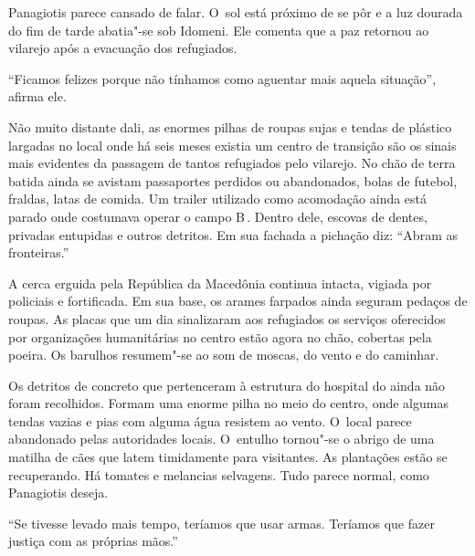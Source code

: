 Panagiotis parece cansado de falar. O~sol está próximo de se pôr e a luz
dourada do fim de tarde abatia"-se sob Idomeni. Ele comenta que a paz
retornou ao vilarejo após a evacuação dos refugiados.

``Ficamos felizes porque não tínhamos como aguentar mais aquela
situação'', afirma ele.

Não muito distante dali, as enormes pilhas de roupas sujas e tendas de
plástico largadas no local onde há seis meses existia um centro de
transição são os sinais mais evidentes da passagem de tantos refugiados
pelo vilarejo. No chão de terra batida ainda se avistam passaportes
perdidos ou abandonados, bolas de futebol, fraldas, latas de comida. Um
trailer utilizado como acomodação ainda está parado onde costumava
operar o campo B\,. Dentro dele, escovas de dentes, privadas entupidas e
outros detritos. Em sua fachada a pichação diz: ``Abram as fronteiras.''

A cerca erguida pela República da Macedônia continua intacta, vigiada
por policiais e fortificada. Em sua base, os arames farpados ainda
seguram pedaços de roupas. As placas que um dia sinalizaram aos
refugiados os serviços oferecidos por organizações humanitárias no
centro estão agora no chão, cobertas pela poeira. Os barulhos
resumem"-se ao som de moscas, do vento e do caminhar.

Os detritos de concreto que pertenceram à estrutura do hospital do 
ainda não foram recolhidos. Formam uma enorme pilha no meio do centro,
onde algumas tendas vazias e pias com alguma água resistem ao vento. O~local parece abandonado pelas autoridades locais. O~entulho tornou"-se o
abrigo de uma matilha de cães que latem timidamente para visitantes. As
plantações estão se recuperando. Há tomates e melancias selvagens. Tudo
parece normal, como Panagiotis deseja.

``Se tivesse levado mais tempo, teríamos que usar armas. Teríamos que
fazer justiça com as próprias mãos.''

